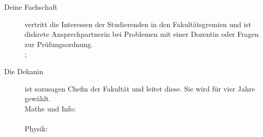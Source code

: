 \begin{description}
    \item[Deine Fachschaft] vertritt die Interessen der Studierenden in den Fakultätsgremien und ist diskrete Ansprechpartnerin bei Problemen mit einer Dozentin oder Fragen zur Prüfungsordnung. \\\fsraum; \\

    \item[Die Dekanin] ist sozusagen Chefin der Fakultät und leitet diese. Sie wird für vier Jahre gewählt.\\
    Mathe und Info: \dekanmathelang \\
    \email{\studiendekanmatheemail} \\
    Physik: \dekanphysiklang \\
    \email{\dekanphysikemail}


\end{description}
